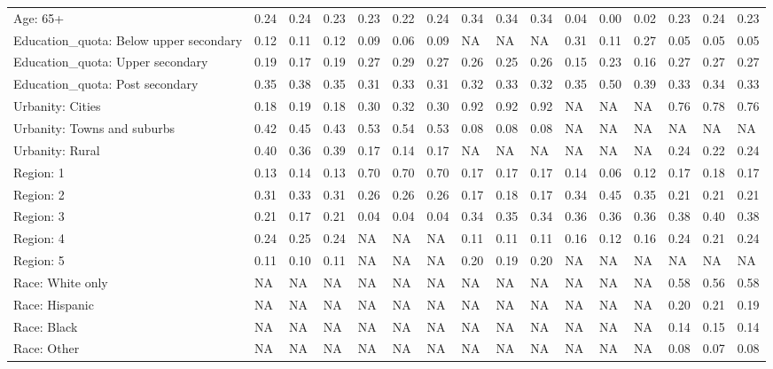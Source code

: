 \begin{tabular}[t]{llllllllllllllll}
Age: 65+ & 0.24 & 0.24 & 0.23 & 0.23 & 0.22 & 0.24 & 0.34 & 0.34 & 0.34 & 0.04 & 0.00 & 0.02 & 0.23 & 0.24 & 0.23\\
\addlinespace
Education\_quota: Below upper secondary & 0.12 & 0.11 & 0.12 & 0.09 & 0.06 & 0.09 & NA & NA & NA & 0.31 & 0.11 & 0.27 & 0.05 & 0.05 & 0.05\\
Education\_quota: Upper secondary & 0.19 & 0.17 & 0.19 & 0.27 & 0.29 & 0.27 & 0.26 & 0.25 & 0.26 & 0.15 & 0.23 & 0.16 & 0.27 & 0.27 & 0.27\\
Education\_quota: Post secondary & 0.35 & 0.38 & 0.35 & 0.31 & 0.33 & 0.31 & 0.32 & 0.33 & 0.32 & 0.35 & 0.50 & 0.39 & 0.33 & 0.34 & 0.33\\
\addlinespace
Urbanity: Cities & 0.18 & 0.19 & 0.18 & 0.30 & 0.32 & 0.30 & 0.92 & 0.92 & 0.92 & NA & NA & NA & 0.76 & 0.78 & 0.76\\
Urbanity: Towns and suburbs & 0.42 & 0.45 & 0.43 & 0.53 & 0.54 & 0.53 & 0.08 & 0.08 & 0.08 & NA & NA & NA & NA & NA & NA\\
Urbanity: Rural & 0.40 & 0.36 & 0.39 & 0.17 & 0.14 & 0.17 & NA & NA & NA & NA & NA & NA & 0.24 & 0.22 & 0.24\\
\addlinespace
Region: 1 & 0.13 & 0.14 & 0.13 & 0.70 & 0.70 & 0.70 & 0.17 & 0.17 & 0.17 & 0.14 & 0.06 & 0.12 & 0.17 & 0.18 & 0.17\\
Region: 2 & 0.31 & 0.33 & 0.31 & 0.26 & 0.26 & 0.26 & 0.17 & 0.18 & 0.17 & 0.34 & 0.45 & 0.35 & 0.21 & 0.21 & 0.21\\
Region: 3 & 0.21 & 0.17 & 0.21 & 0.04 & 0.04 & 0.04 & 0.34 & 0.35 & 0.34 & 0.36 & 0.36 & 0.36 & 0.38 & 0.40 & 0.38\\
Region: 4 & 0.24 & 0.25 & 0.24 & NA & NA & NA & 0.11 & 0.11 & 0.11 & 0.16 & 0.12 & 0.16 & 0.24 & 0.21 & 0.24\\
Region: 5 & 0.11 & 0.10 & 0.11 & NA & NA & NA & 0.20 & 0.19 & 0.20 & NA & NA & NA & NA & NA & NA\\
\addlinespace
Race: White only & NA & NA & NA & NA & NA & NA & NA & NA & NA & NA & NA & NA & 0.58 & 0.56 & 0.58\\
Race: Hispanic & NA & NA & NA & NA & NA & NA & NA & NA & NA & NA & NA & NA & 0.20 & 0.21 & 0.19\\
Race: Black & NA & NA & NA & NA & NA & NA & NA & NA & NA & NA & NA & NA & 0.14 & 0.15 & 0.14\\
Race: Other & NA & NA & NA & NA & NA & NA & NA & NA & NA & NA & NA & NA & 0.08 & 0.07 & 0.08\\
\bottomrule
\end{tabular}